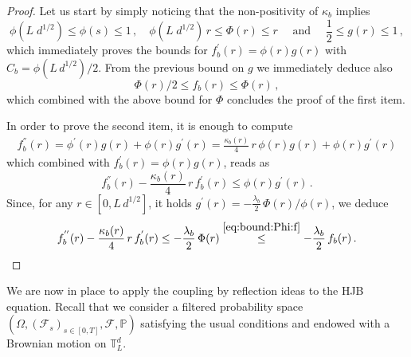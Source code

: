 \documentclass[final,12pt]{colt2023} %
\newcommand{\bes}{\begin{equation}}
\newcommand{\ees}{\end{equation}}
\def\torus{\tset}
\def\torusL{\torus_L}
\def\tset{\mathbb{T}}
\def\eqsp{\;}
\begin{document}
\begin{proof}
Let us start by simply noticing that the non-positivity of $\kappa_b$ implies
\bes
\phi(L\eqsp d^{1/2})\leq \phi(s)\leq 1\,,\quad\phi(L\eqsp d^{1/2})\,r\leq \Phi(r)\leq r\quad\text{ and }\quad \frac12\leq g(r)\leq 1\,,
\ees
which immediately proves the bounds for $f_b^{'}(r)=\phi(r)g(r)$ with $C_b=\phi(L\,d^{1/2})/2$. From the previous bound on $g$ we immediately deduce also
\begin{equation}\label{eq:bound:Phi:f}
    \Phi(r)/2\leq f_b(r)\leq \Phi(r)\,,
\end{equation}
which combined with the above bound for $\Phi$ concludes the proof of the first item.

\medskip

In order to prove the second item, it is enough to compute
\bes 
\begin{split}
f_b^{''}(r)=\phi^{'}(r)g(r)+\phi(r)g^{'}(r)=\frac{\kappa_b(r)}{4}\,r\,\phi(r)g(r)+\phi(r)g^{'}(r)
\end{split}
\ees
which combined with  $f_b^{'}(r)=\phi(r) g(r)$, reads as
\bes
f^{''}_b(r)-\frac{\kappa_b(r)}{4}\,r\,f^{'}_b(r)\leq \phi(r)g^{'}(r)\,.
\ees
Since, for any $r\in[0,L\,d^{1/2}]$, it holds $g^{'}(r)= -\frac{\lambda_b}{2}\,\Phi(r)/\phi(r)$, we deduce  
\bes
f^{''}_b(r)-\frac{\kappa_b(r)}{4}\,r\,f^{'}_b(r)\leq -\frac{\lambda_b}{2}\,\Phi(r)\overset{\eqref{eq:bound:Phi:f}}{\leq} -\frac{\lambda_b}{2}\,f_b(r)\,.
\ees
\end{proof}



We are now in place to apply the coupling by reflection ideas to the HJB equation.
Recall that we consider a filtered probability space
$(\Omega, (\mathcal{F}_s)_{s\in[0,T]},\mathcal{F}, \mathbb{P})$ satisfying the usual conditions and endowed with a Brownian motion on $\torusL^d$.
\end{document}
